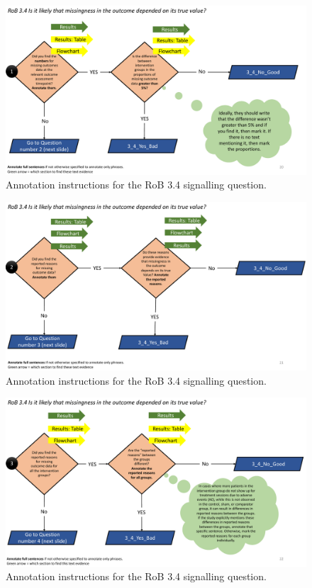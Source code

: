 \documentclass[sn-mathphys,Numbered]{sn-jnl}%
\begin{document}
%
%
%
\begin{figure}[hbt]
    \centering
    \includegraphics[width=\textwidth]{figures/3_4_1.pdf}
    \caption{Annotation instructions for the RoB 3.4 signalling question.}
    \label{fig:3_4_1}
\end{figure}


\begin{figure}[hbt]
    \centering
    \includegraphics[width=\textwidth]{figures/3_4_2.pdf}
    \caption{Annotation instructions for the RoB 3.4 signalling question.}
    \label{fig:3_4_2}
\end{figure}


\begin{figure}[hbt]
    \centering
    \includegraphics[width=\textwidth]{figures/3_4_3.pdf}
    \caption{Annotation instructions for the RoB 3.4 signalling question.}
    \label{fig:3_4_3}
\end{figure}
\end{document}
